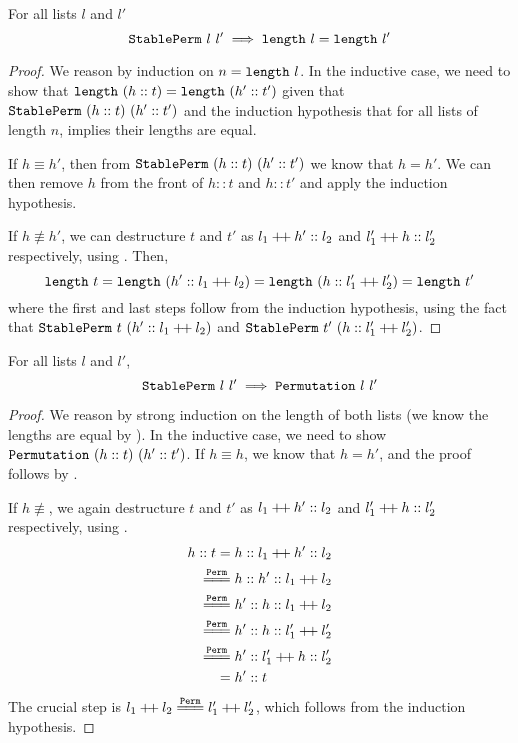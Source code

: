 \documentclass[sigplan,10pt,anonymous,review]{thesis}
\begin{document}
\begin{theorem}
  For all lists $l$ and $l'$
  \begin{equation*}
    \texttt{\textup{StablePerm}}~l~l' \implies \texttt{\textup{length}}~l = \texttt{\textup{length}}~l'
  \end{equation*}
\end{theorem}
\begin{proof}
  We reason by induction on $n = \texttt{\textup{length}}~l$. In the inductive
  case, we need to show that $\texttt{\textup{length}}~(h::t) =
  \texttt{\textup{length}}~(h'::t')$ given that $\texttt{\textup{StablePerm}}~(h::t)~(h'::t')$
  and the induction hypothesis that for all lists of length $n$,
   implies their lengths are equal.

  If $h \equiv h'$, then from $\texttt{\textup{StablePerm}}~(h::t)~(h'::t')$ we know
  that $h = h'$. We can then remove $h$ from the front of $h::t$ and
  $h::t'$ and apply the induction hypothesis.

  If $h \not\equiv h'$, we can destructure $t$ and $t'$ as $l_1 \mathbin{+\mkern-3mu+} h'
  :: l_2$ and $l_1' \mathbin{+\mkern-3mu+} h :: l_2'$ respectively, using
  . Then,
  \begin{equation*}
    \texttt{\textup{length}}~t
    = \texttt{\textup{length}}~(h' :: l_1  \mathbin{+\mkern-3mu+} l_2)
    = \texttt{\textup{length}}~(h  :: l_1' \mathbin{+\mkern-3mu+} l_2')
    =\texttt{\textup{length}}~t'
  \end{equation*}
  where the first and last steps follow from the induction hypothesis,
  using the fact that $\texttt{\textup{StablePerm}}~t~(h'::l_1 \mathbin{+\mkern-3mu+} l_2)$ and
  $\texttt{\textup{StablePerm}}~t'~(h::l_1' \mathbin{+\mkern-3mu+} l_2')$.
\end{proof}

\begin{theorem}
  For all lists $l$ and $l'$,
  \begin{equation*}
    \texttt{\textup{StablePerm}}~l~l' \implies \texttt{\textup{Permutation}}~l~l'
  \end{equation*}
\end{theorem}
\begin{proof}
  We reason by strong induction on the length of both lists (we know
  the lengths are equal by ). In the inductive
  case, we need to show $\texttt{\textup{Permutation}}~(h :: t)~(h' :: t')$. If $h
  \equiv h$, we know that $h = h'$, and the proof follows by
  .

  If $h \not\equiv$, we again destructure $t$ and $t'$ as $l_1 \mathbin{+\mkern-3mu+} h' ::
  l_2$ and $l_1' \mathbin{+\mkern-3mu+} h :: l_2'$ respectively, using
  .
  \begin{align*}
    h::t ={}& h :: l_1 \dplus h' :: l_2 \\
    \eqperm{}& h :: h' :: l_1 \dplus l_2 \\
    \eqperm{}& h' :: h :: l_1 \dplus l_2 \\
    \eqperm{}& h' :: h :: l_1' \dplus l_2' \\
    \eqperm{}& h' :: l_1' \dplus h :: l_2' \\
    ={}& h'::t
  \end{align*}
  The crucial step is $l_1 \dplus l_2 \eqperm l_1' \dplus l_2'$, which
  follows from the induction hypothesis.
\end{proof}
\end{document}
